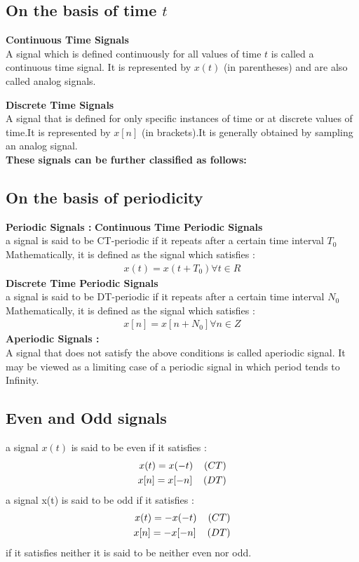 \documentclass[a4paper,12pt]{book}
\begin{document}
\subsection*{\Large{On the basis of time $t$}}
\textbf{Continuous Time Signals}\\
A signal which is defined continuously for all values of time $t$ is called a continuous time signal. It is represented by $x(t)$ (in parentheses) and are also called analog signals.

{\bf Discrete Time Signals}\\ A signal that is defined for only specific instances of time or at discrete values of time.It is represented by $x[n]$ (in brackets).It is generally obtained by sampling an analog signal.\\

{\bf These signals can be further classified as follows:}
\subsection*{\Large{On the basis of periodicity}}
\textbf{Periodic Signals :}
{\bf Continuous Time Periodic Signals }\\
a signal is said to be CT-periodic if it repeats after a certain time interval $T_0$\\
Mathematically, it is defined as the signal which satisfies :\\
\begin{align*}
x(t)=x(t+T_0)  \forall  t  \in R
\end{align*}
{\bf Discrete Time Periodic Signals }\\
a signal is said to be DT-periodic if it repeats after a certain time interval $N_0$\\
Mathematically, it is defined as the signal which satisfies :\\
\begin{align*}
x[n]=x[n+N_0]  \forall  n  \in Z
\end{align*}
{\bf Aperiodic Signals :}\\ A signal that does not satisfy the above conditions is called aperiodic signal. It may be viewed as a limiting case of a periodic signal in which period tends to Infinity.
\subsection*{\Large{Even and Odd signals }}
	a signal $x(t)$ is said to be even if it satisfies :
	\begin{align*}
	x(t)=x(-t){\hspace{4mm}(CT)}\\
	x[n]=x[-n]{\hspace{4mm}(DT)}
	\end{align*}
	a signal x(t) is said to be odd if it satisfies :
	\begin{align*}x(t)=-x(-t){\hspace{4mm}(CT)}\\x[n]=-x[-n]{\hspace{4mm}(DT)}\end{align*}	
	if it satisfies neither it is said to be neither even nor odd.\\
\end{document}
